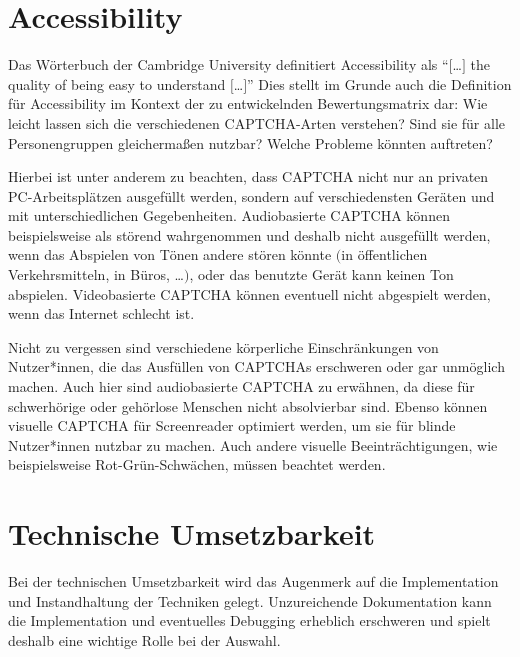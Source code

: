 
\section{Accessibility}

Das Wörterbuch der Cambridge University definitiert Accessibility als ``$[$\dots$]$ the quality of being easy to understand $[$\dots$]$'' %
Dies stellt im Grunde auch die Definition für Accessibility im Kontext der zu entwickelnden Bewertungsmatrix dar: 
Wie leicht lassen sich die verschiedenen CAPTCHA-Arten verstehen? Sind sie für alle Personengruppen gleichermaßen nutzbar? 
Welche Probleme könnten auftreten?

Hierbei ist unter anderem zu beachten, dass CAPTCHA nicht nur an privaten PC-Arbeitsplätzen ausgefüllt werden, 
sondern auf verschiedensten Geräten und mit unterschiedlichen Gegebenheiten. 
Audiobasierte CAPTCHA können beispielsweise als störend wahrgenommen und deshalb nicht ausgefüllt werden, 
wenn das Abspielen von Tönen andere stören könnte $($in öffentlichen Verkehrsmitteln, in Büros, \dots$)$, 
oder das benutzte Gerät kann keinen Ton abspielen. Videobasierte CAPTCHA können eventuell nicht abgespielt werden, 
wenn das Internet schlecht ist.

Nicht zu vergessen sind verschiedene körperliche Einschränkungen von Nutzer*innen, 
die das Ausfüllen von CAPTCHAs erschweren oder gar unmöglich machen. Auch hier sind audiobasierte CAPTCHA zu erwähnen, 
da diese für schwerhörige oder gehörlose Menschen nicht absolvierbar sind. 
Ebenso können visuelle CAPTCHA für Screenreader optimiert werden, um sie für blinde Nutzer*innen nutzbar zu machen. 
Auch andere visuelle Beeinträchtigungen, wie beispielsweise Rot-Grün-Schwächen, müssen beachtet werden.


\section{Technische Umsetzbarkeit}

Bei der technischen Umsetzbarkeit wird das Augenmerk auf die Implementation und Instandhaltung der Techniken gelegt. 
Unzureichende Dokumentation kann die Implementation und eventuelles Debugging erheblich erschweren 
und spielt deshalb eine wichtige Rolle bei der Auswahl. 

